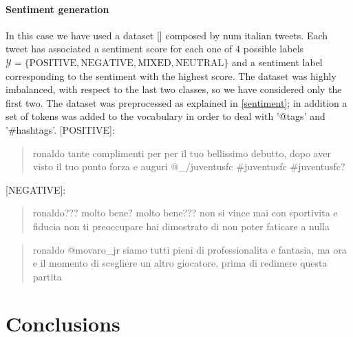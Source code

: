 \documentclass[10pt,twocolumn,letterpaper]{article}
\begin{document}
\paragraph{Sentiment generation} In this case we have used a dataset [] composed by num italian tweets.
Each tweet has associated a sentiment score for each one of 4 possible labels
$\mathcal Y = \{\text{POSITIVE}, \text{NEGATIVE}, \text{MIXED}, \text{NEUTRAL}\}$ and a sentiment label corresponding
to the sentiment with the highest score.
The dataset was highly imbalanced, with respect to the last two classes, so we have considered only the first two.
The dataset was preprocessed as explained in \ref{sentiment}; in addition a set of tokens was added to the vocabulary
in order to deal with '@tags' and '#hashtags'.
[POSITIVE]:
\begin{quote}
   ronaldo tante complimenti per per il tuo bellissimo debutto, dopo aver visto il tuo punto forza e auguri @\_/juventusfc #juventusfc #juventusfc?
\end{quote}

[NEGATIVE]:
\begin{quote}
   ronaldo??? molto bene? molto bene??? non si vince mai con sportivita e fiducia non ti preoccupare hai dimostrato di non poter faticare a nulla
\end{quote}
\begin{quote}
   ronaldo @movaro\_jr siamo tutti pieni di professionalita e fantasia, ma ora e il momento di scegliere un altro giocatore, prima di redimere questa partita
\end{quote}




\section{Conclusions}



\end{document}
